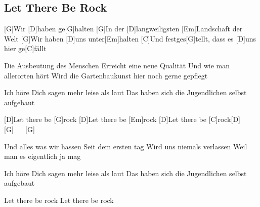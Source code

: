 \subsection*{Let There Be Rock   }



\begin{guitar}


[G]Wir [D]haben ge[G]halten
[G]In der [D]langweiligsten [Em]Landschaft der Welt
[G]Wir haben [D]uns unter[Em]halten
[C]Und festges[G]tellt, dass es [D]uns hier ge[C]fällt


Die Ausbeutung des Menschen
Erreicht eine neue Qualität
Und wie man allerorten hört
Wird die Gartenbaukunst hier noch gerne gepflegt

Ich höre Dich sagen mehr leise als laut
Das haben sich die Jugendlichen selbst aufgebaut


[D]Let there be [G]rock
[D]Let there be [Em]rock
[D]Let there be [C]rock[D] $\quad$ [G] $\quad$ [G] $\quad$


Und alles was wir hassen
Seit dem ersten tag
Wird uns niemals verlassen
Weil man es eigentlich ja mag

Ich höre Dich sagen mehr leise als laut
Das haben sich die Jugendlichen selbst aufgebaut

Let there be rock
Let there be rock
\end{guitar}
